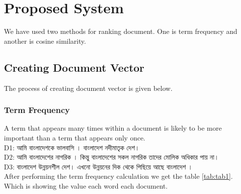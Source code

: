 \chapter{Proposed System}
\label{Ch_Chapter3}


We have used two methods for ranking document. One is term frequency and another is cosine similarity.

\section{Creating Document Vector}
The process of creating document vector is given below.

\subsection{Term Frequency}

A term that appears many times within a document is likely to be more important than a term that appears only once.\\
D1: {\unicodefont আমি  বাংলাদেশকে ভালবাসি । বাংলাদেশ নদীমাতৃক দেশ।}  \\ 
D2: {\unicodefont আমি বাংলাদেশের নাগরিক । কিন্তু বাংলাদেশের সকল  নাগরিক তাদের মোলিক অধিকার পায় না।} \\
D3: {\unicodefont বাংলাদেশ উন্নয়নশীল দেশ। এখনো উন্নয়নের দিক থেকে পিছিয়ে আছে বাংলাদেশ । } \\

After performing the term frequency calculation we get the table \ref{tab:tab1}. Which is showing the value each word each document.

